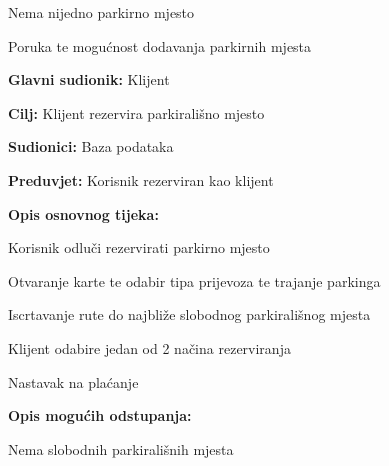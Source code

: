 \begin{packed_item}
\begin{packed_item}
\begin{packed_item}
    						\item[2.a] Nema nijedno parkirno mjesto
    						\item[] \begin{packed_enum}
    							
    							\item Poruka te mogućnost dodavanja parkirnih mjesta
    							
    						\end{packed_enum}
    						
    					\end{packed_item}
    				\end{packed_item}
    				\noindent {}
    				\begin{packed_item}
    					
    					\item \textbf{Glavni sudionik: } Klijent
    					\item  \textbf{Cilj:} Klijent rezervira parkirališno mjesto
    					\item  \textbf{Sudionici:} Baza podataka
    					\item  \textbf{Preduvjet:} Korisnik rezerviran kao klijent
    					\item  \textbf{Opis osnovnog tijeka:}
    					
    					\item[] \begin{packed_enum}
    						
    						\item Korisnik odluči rezervirati parkirno mjesto
    						\item Otvaranje karte te odabir tipa prijevoza te trajanje parkinga	
    						\item Iscrtavanje rute do najbliže slobodnog parkirališnog mjesta
    						\item Klijent odabire jedan od 2 načina rezerviranja
    						\item Nastavak na plaćanje
    					\end{packed_enum}
    					
    					\item  \textbf{Opis mogućih odstupanja:}
    					
    					\item[] \begin{packed_item}
    						
    						\item[3.a] Nema slobodnih parkirališnih mjesta
    						\item[] \begin{packed_enum}
    							

\end{packed_enum}
\end{packed_item}
\end{packed_item}
\end{packed_item}
